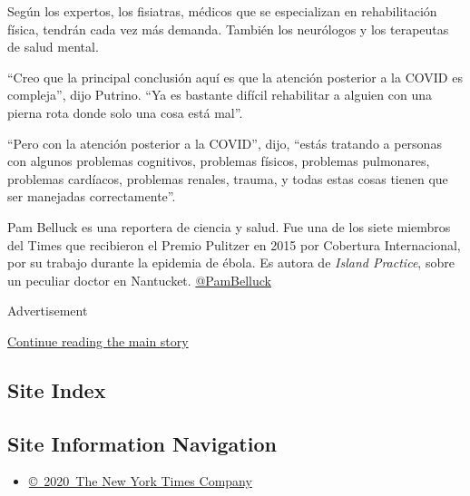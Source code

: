 Según los expertos, los fisiatras, médicos que se especializan en
rehabilitación física, tendrán cada vez más demanda. También los
neurólogos y los terapeutas de salud mental.

``Creo que la principal conclusión aquí es que la atención posterior a
la COVID es compleja'', dijo Putrino. ``Ya es bastante difícil
rehabilitar a alguien con una pierna rota donde solo una cosa está
mal''.

``Pero con la atención posterior a la COVID'', dijo, ``estás tratando a
personas con algunos problemas cognitivos, problemas físicos, problemas
pulmonares, problemas cardíacos, problemas renales, trauma, y todas
estas cosas tienen que ser manejadas correctamente''.

Pam Belluck es una reportera de ciencia y salud. Fue una de los siete
miembros del Times que recibieron el Premio Pulitzer en 2015 por
Cobertura Internacional, por su trabajo durante la epidemia de ébola. Es
autora de \emph{Island Practice}, sobre un peculiar doctor en Nantucket.
\href{https://twitter.com/PamBelluck}{@PamBelluck}

Advertisement

\protect\hyperlink{after-bottom}{Continue reading the main story}

\hypertarget{site-index}{%
\subsection{Site Index}\label{site-index}}

\hypertarget{site-information-navigation}{%
\subsection{Site Information
Navigation}\label{site-information-navigation}}

\begin{itemize}
\tightlist
\item
  \href{https://help.nytimes3xbfgragh.onion/hc/en-us/articles/115014792127-Copyright-notice}{©~2020~The
  New York Times Company}
\end{itemize}

